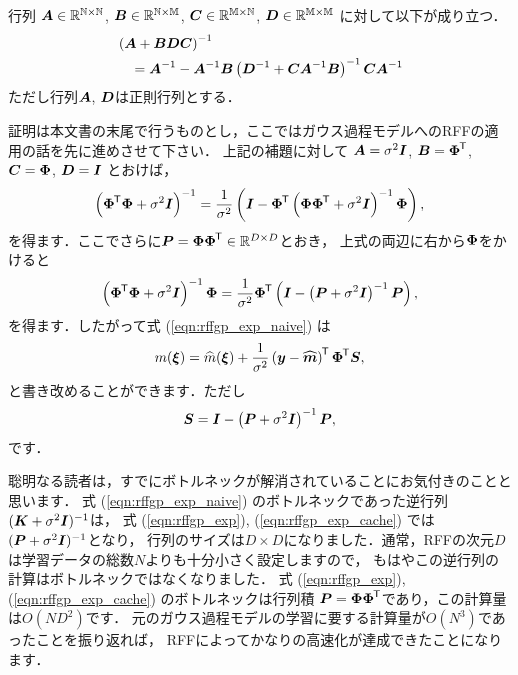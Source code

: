 \begin{theorem}[逆行列の反転補題]
    行列
    $\boldsymbol{A} \in \mathbb{R^{N \times N}}$,
    $\boldsymbol{B} \in \mathbb{R^{N \times M}}$,
    $\boldsymbol{C} \in \mathbb{R^{M \times N}}$,
    $\boldsymbol{D} \in \mathbb{R^{M \times M}}$
    に対して以下が成り立つ．
    \begin{align}
        &\left( \boldsymbol{A} + \boldsymbol{BDC} \right)^{-1} \notag \\
        &\hspace{10pt}
        = \boldsymbol{A}^{-1} - \boldsymbol{A}^{-1} \boldsymbol{B} \left( \boldsymbol{D}^{-1} + \boldsymbol{CA}^{-1} \boldsymbol{B} \right)^{-1} \boldsymbol{CA}^{-1}
        \label{eqn:bunominal_inverse_lemma}
    \end{align}
    ただし行列$\boldsymbol{A}$, $\boldsymbol{D}$は正則行列とする．
\end{theorem}
証明は本文書の末尾で行うものとし，ここではガウス過程モデルへのRFFの適用の話を先に進めさせて下さい．
上記の補題に対して
$\boldsymbol{A} = \sigma^2 \boldsymbol{I}$,
$\boldsymbol{B} = \boldsymbol{\Phi}^{\mkern-1.5mu\mathsf{T}}$,
$\boldsymbol{C} = \boldsymbol{\Phi}$,
$\boldsymbol{D} = \boldsymbol{I}$
とおけば，
\begin{equation*}
    \left( \boldsymbol{\Phi}^{\mkern-1.5mu\mathsf{T}} \boldsymbol{\Phi} + \sigma^2 \boldsymbol{I} \right)^{-1}
    = \frac{1}{\sigma^2} \left( \boldsymbol{I} - \boldsymbol{\Phi}^{\mkern-1.5mu\mathsf{T}} \left( 
    \boldsymbol{\Phi\Phi}^{\mkern-1.5mu\mathsf{T}} + \sigma^2 \boldsymbol{I} \right)^{-1} \boldsymbol{\Phi} \right),
\end{equation*}
を得ます．ここでさらに$\boldsymbol{P} = \boldsymbol{\Phi\Phi}^{\mkern-1.5mu\mathsf{T}} \in \mathbb{R}^{D \times D}$とおき，
上式の両辺に右から$\boldsymbol{\Phi}$をかけると
\begin{equation}
    \left( \boldsymbol{\Phi}^{\mkern-1.5mu\mathsf{T}} \boldsymbol{\Phi} + \sigma^2 \boldsymbol{I} \right)^{-1} \boldsymbol{\Phi}
    = \frac{1}{\sigma^2} \boldsymbol{\Phi}^{\mkern-1.5mu\mathsf{T}} \left(
    \boldsymbol{I} - \left( \boldsymbol{P} + \sigma^2 \boldsymbol{I} \right)^{-1} \boldsymbol{P} \right),
    \label{eqn:rff_key_eqn}
\end{equation}
を得ます．したがって式 (\ref{eqn:rffgp_exp_naive}) は
\begin{equation}
    m(\boldsymbol{\xi}) = \widehat{m}(\boldsymbol{\xi}) + \frac{1}{\sigma^2}
    \left( \boldsymbol{y} - \widehat{\boldsymbol{m}} \right)^{\mkern-1.5mu\mathsf{T}} \boldsymbol{\Phi}^{\mkern-1.5mu\mathsf{T}} \boldsymbol{S},
    \label{eqn:rffgp_exp}
\end{equation}
と書き改めることができます．ただし
\begin{equation}
    \boldsymbol{S} = \boldsymbol{I} - \left( \boldsymbol{P} + \sigma^2 \boldsymbol{I} \right)^{-1} \boldsymbol{P},
    \label{eqn:rffgp_exp_cache}
\end{equation}
です．

聡明なる読者は，すでにボトルネックが解消されていることにお気付きのことと思います．
式 (\ref{eqn:rffgp_exp_naive}) のボトルネックであった逆行列$( \boldsymbol{K} + \sigma^2 \boldsymbol{I})^{-1}$は，
式 (\ref{eqn:rffgp_exp}), (\ref{eqn:rffgp_exp_cache}) では $( \boldsymbol{P} + \sigma^2 \boldsymbol{I})^{-1}$となり，
行列のサイズは$D \times D$になりました．通常，RFFの次元$D$は学習データの総数$N$よりも十分小さく設定しますので，
もはやこの逆行列の計算はボトルネックではなくなりました．
式 (\ref{eqn:rffgp_exp}), (\ref{eqn:rffgp_exp_cache}) のボトルネックは行列積
$\boldsymbol{P} = \boldsymbol{\Phi\Phi}^{\mkern-1.5mu\mathsf{T}}$であり，この計算量は$O(ND^2)$です．
元のガウス過程モデルの学習に要する計算量が$O(N^3)$であったことを振り返れば，
RFFによってかなりの高速化が達成できたことになります．

